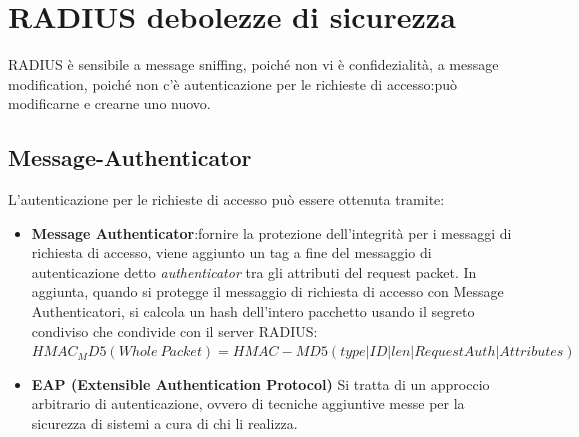 \documentclass{book}
\theoremstyle{remark}
\begin{document}
\section{RADIUS debolezze di sicurezza}
RADIUS è sensibile a message sniffing, poiché non vi è confidezialità, a message modification, poiché non c'è autenticazione per le richieste di accesso:\@ognuno può modificarne e crearne uno nuovo\@.
\subsection{Message-Authenticator}
L'autenticazione per le richieste di accesso può essere ottenuta tramite:\begin{itemize}
	\item \textbf{Message Authenticator}:\@per fornire la protezione dell'integrità per i messaggi di richiesta di accesso, viene aggiunto un tag a fine del messaggio di autenticazione detto \emph{authenticator} tra gli attributi del request packet\@. In aggiunta, quando si protegge il messaggio di richiesta di accesso con Message Authenticatori, si calcola un hash dell'intero pacchetto usando il segreto condiviso che condivide con il server RADIUS:\(HMAC_MD5 (Whole\ Packet)=HMAC-MD5 (type|ID|len|RequestAuth|Attributes)\)
	\item \textbf{EAP (Extensible Authentication Protocol)} Si tratta di un approccio arbitrario di autenticazione, ovvero di tecniche aggiuntive messe per la sicurezza di sistemi a cura di chi li realizza\@.
\end{itemize}
\end{document}

